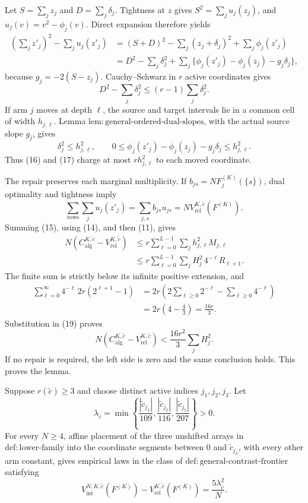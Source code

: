 Let \(S=\sum_jz_j\) and \(D=\sum_j\delta_j\).  Tightness at \(z\) gives \(S^2=\sum_ju_j(z_j)\), and \(u_j(v)=v^2-\phi_j(v)\).  Direct expansion therefore yields
\[
\begin{aligned}
 \left(\sum_jz'_j\right)^2-\sum_ju_j(z'_j)
 &= (S+D)^2-\sum_j(z_j+\delta_j)^2+\sum_j\phi_j(z'_j)\\
 &=D^2-\sum_j\delta_j^2
 +\sum_j\{\phi_j(z'_j)-\phi_j(z_j)-g_j\delta_j\},
\end{aligned} \tag{15}
\]
because \(g_j=-2(S-z_j)\).  Cauchy--Schwarz in \(r\) active coordinates gives
\[
 D^2-\sum_j\delta_j^2\le(r-1)\sum_j\delta_j^2. \tag{16}
\]
If arm \(j\) moves at depth \(\ell\), the source and target intervals lie in a common cell of width \(h_{j,\ell}\).  Lemma \(\mathrm{lem{:}general\mbox{-}ordered\mbox{-}dual\mbox{-}slopes}\), with the actual source slope \(g_j\), gives
\[
 \delta_j^2\le h_{j,\ell}^2,\qquad
 0\le\phi_j(z'_j)-\phi_j(z_j)-g_j\delta_j\le h_{j,\ell}^2. \tag{17}
\]
Thus (16) and (17) charge at most \(r h_{j,\ell}^2\) to each moved coordinate.

The repair preserves each marginal multiplicity.  If \(b_{js}=NF_j^{(K)}(\{s\})\), dual optimality and tightness imply
\[
 \sum_{\mathrm{rows}}\sum_ju_j(z'_j)
 =\sum_{j,s}b_{js}u_{js}
 =N V_{\mathrm{rel}}^{K,\widetilde c}(F^{(K)}). \tag{18}
\]
Summing (15), using (14), and then (11), gives
\[
\begin{aligned}
 N(C_{\mathrm{alg}}^{K,\widetilde c}-V_{\mathrm{rel}}^{K,\widetilde c})
 &\le r\sum_{\ell=0}^{L-1}\sum_jh_{j,\ell}^2M_{j,\ell}\\
 &\le r\sum_{\ell=0}^{L-1}\sum_jH_j^2\,4^{-\ell}R_{\ell+1}.
\end{aligned} \tag{19}
\]
The finite sum is strictly below its infinite positive extension, and
\[
\begin{aligned}
 \sum_{\ell=0}^{\infty}4^{-\ell}\,2r(2^{\ell+1}-1)
 &=2r\left(2\sum_{\ell\ge0}2^{-\ell}-\sum_{\ell\ge0}4^{-\ell}\right)\\
 &=2r\left(4-\frac43\right)=\frac{16r}{3}.
\end{aligned} \tag{20}
\]
Substitution in (19) proves
\[
 N(C_{\mathrm{alg}}^{K,\widetilde c}-V_{\mathrm{rel}}^{K,\widetilde c})
 <\frac{16r^2}{3}\sum_jH_j^2.
\]
If no repair is required, the left side is zero and the same conclusion holds.  This proves the lemma.

Suppose \(r(\widetilde c)\ge3\) and choose distinct active indices \(j_1,j_2,j_3\).  Let
\[
 \lambda_{\widetilde c}
 =\min\left\{\frac{|\widetilde c_{j_1}|}{109},
 \frac{|\widetilde c_{j_2}|}{116},
 \frac{|\widetilde c_{j_3}|}{207}\right\}>0.
\]
For every \(N\ge4\), affine placement of the three unshifted arrays in \(\mathrm{def{:}lower\mbox{-}family}\) into the coordinate segments between \(0\) and \(\widetilde c_{j_k}\), with every other arm constant, gives empirical laws in the class of \(\mathrm{def{:}general\mbox{-}contrast\mbox{-}frontier}\) satisfying
\[
 V_{\mathrm{int}}^{N,K,\widetilde c}(F^{(K)})-
 V_{\mathrm{rel}}^{K,\widetilde c}(F^{(K)})
 =\frac{5\lambda_{\widetilde c}^2}{N}.
\]

